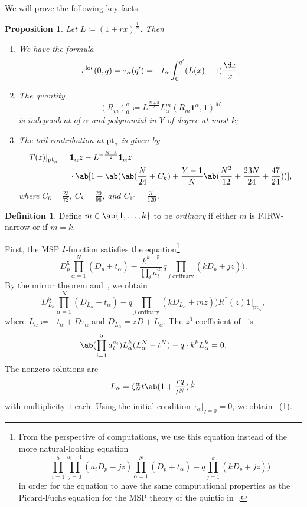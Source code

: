 \documentclass[10pt]{amsart}
\newtheorem{prop}[thm]{Proposition}
\theoremstyle{definition}
\newtheorem{defn}[thm]{Definition}
\theoremstyle{remark}
\theoremstyle{plain}
\theoremstyle{definition}
\theoremstyle{remark}
\newcommand{\mbf}[1]{\mathbf{#1}}
\newcommand{\mr}[1]{\mathrm{#1}}
\newcommand{\1}{\mathbf{1}}
\newcommand{\2}{\mathbf{2}}
\newcommand{\3}{\mathbf{3}}
\newcommand{\pt}{\mr{pt}}
\newcommand{\loc}{\mr{loc}}
\numberwithin{equation}{section}
\begin{document}
We will prove the following key facts.
\begin{prop}\label{prop:rmatlevel1}
    Let $L \coloneqq (1+rx)^{\frac{1}{N}}$. Then
    \begin{enumerate}
        \item We have the formula
    \[ \tau^{\loc}(0,q) = \tau_{\alpha}(q') = -t_{\alpha}\int_0^{q'} (L(x)-1) \frac{\d x}{x}; \]
\item The quantity \[ (R_m)_0^{\alpha} \coloneqq L^{\frac{N+3}{2}} L_{\alpha}^m (R_m \mbf{1}^{\alpha}, \mbf{1})^M \]
    is independent of $\alpha$ and polynomial in $Y$ of degree at most $k$;
        \item The tail contribution at $\pt_{\alpha}$ is given by
            \begin{align*}
                T(z)|_{\pt_{\alpha}} ={}& \mbf{1}_{\alpha} z - L^{- \frac{N+3}{2}} \mbf{1}_{\alpha}z \\
                & \cdot \ab[1 - \ab(\ab(\frac{N}{24} + C_k) + \frac{Y-1}{N} \ab(\frac{N^2}{12} + \frac{23N}{24} + \frac{47}{24})) ], 
            \end{align*}
            where $C_6 = \frac{23}{72}$, $C_8 = \frac{29}{96}$, and $C_{10} = \frac{31}{120}$.
    \end{enumerate}
\end{prop}

\begin{defn}
    Define $m \in \ab\{1, \ldots, k\}$ to be \textit{ordinary} if either $m$ is FJRW-narrow or if $m=k$.
\end{defn}


First, the MSP $I$-function satisfies the equation\footnote{From the perspective of computations, we use this equation instead of the more natural-looking equation
\[  \prod_{i=1}^5 \prod_{j=0}^{a_i-1} (a_i D_p-jz) \prod_{\alpha=1}^N(D_p+t_{\alpha}) -  q \prod_{j =1}^k (kD_p + jz)) \]
in order for the equation to have the same computational properties as the Picard-Fuchs equation for the MSP theory of the quintic in~\cite[\S 6]{nmsp2}.}
\[ D_p^5 \prod_{\alpha=1}^N(D_p+t_{\alpha}) - \frac{k^{k-5}}{\prod_i a_i^{a_i}} q \prod_{j \text{ ordinary}} (kD_p + jz)). \]
By the mirror theorem and~, we obtain
\begin{equation}\label{eqn:pfrmatrix}
    D_{L_{\alpha}}^5 \prod_{\alpha=1}^N(D_{L_{\alpha}}+t_{\alpha}) - q \prod_{j\text{ ordinary}} (kD_{L_{\alpha}} + mz)) R^*(z) \1 |_{\pt_{\alpha}},
\end{equation}
where $L_{\alpha} \coloneqq -t_{\alpha} + D \tau_{\alpha}$ and $D_{L_{\alpha}} = zD + L_{\alpha}$. The $z^0$-coefficient of~ is
\[ \ab( \prod_{i=1}^5 a_i^{a_i} )L_{\alpha}^k (L_{\alpha}^N - t^N) - q \cdot k^k L_{\alpha}^k = 0. \]
The nonzero solutions are
\[ L_{\alpha} = \zeta_N^{\alpha}t \ab(1+\frac{rq}{t^N})^{\frac{1}{N}} \]
with multiplicity $1$ each.
Using the initial condition $\tau_{\alpha}|_{q=0} = 0$, we obtain~ (1).
\end{document}
